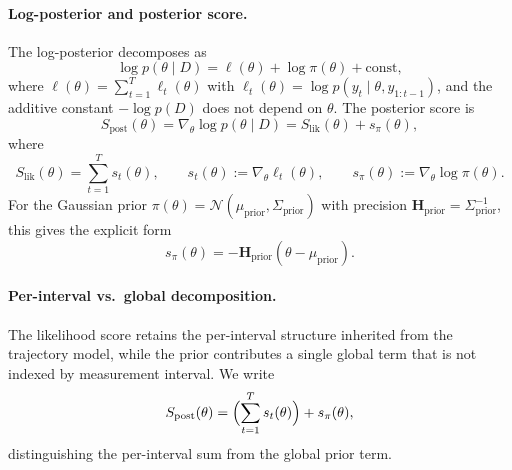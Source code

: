 \documentclass[11pt]{article}
\begin{document}
\paragraph{Log-posterior and posterior score.}
The log-posterior decomposes as
\begin{equation}
\log p(\theta \mid D)
=
\ell(\theta) + \log \pi(\theta) + \mathrm{const},
\label{eq:log-posterior-def}
\end{equation}
where $\ell(\theta) = \sum_{t=1}^T \ell_t(\theta)$ with $\ell_t(\theta) = \log p(y_t \mid \theta, y_{1:t-1})$, and the additive constant $-\log p(D)$ does not depend on $\theta$. The posterior score is
\begin{equation}
S_{\mathrm{post}}(\theta)
=
\nabla_\theta \log p(\theta \mid D)
=
S_{\mathrm{lik}}(\theta) + s_\pi(\theta),
\label{eq:post-score-def}
\end{equation}
where
\begin{equation}
S_{\mathrm{lik}}(\theta) = \sum_{t=1}^T s_t(\theta),
\qquad
s_t(\theta) := \nabla_\theta \ell_t(\theta),
\qquad
s_\pi(\theta) := \nabla_\theta \log \pi(\theta).
\label{eq:scores-components}
\end{equation}
For the Gaussian prior $\pi(\theta) = \mathcal{N}(\mu_{\mathrm{prior}}, \Sigma_{\mathrm{prior}})$ with precision $\mathbf H_{\mathrm{prior}} = \Sigma_{\mathrm{prior}}^{-1}$, this gives the explicit form
\begin{equation}
s_\pi(\theta) = -\mathbf H_{\mathrm{prior}}(\theta - \mu_{\mathrm{prior}}).
\label{eq:prior-score-gaussian}
\end{equation}

\paragraph{Per-interval vs.\ global decomposition.}
The likelihood score retains the per-interval structure inherited from the trajectory model, while the prior contributes a single global term that is not indexed by measurement interval. We write
\begin{equation}
S_{\mathrm{post}}(\theta)
=
\Bigl(\sum_{t=1}^T s_t(\theta)\Bigr) + s_\pi(\theta),
\label{eq:post-score-decomp}
\end{equation}
distinguishing the per-interval sum from the global prior term.
\end{document}
